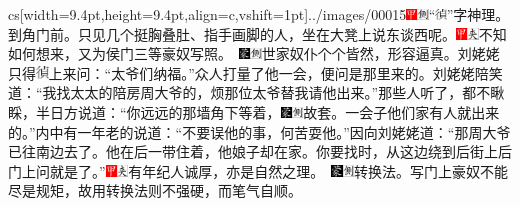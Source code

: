 cs[width=9.4pt,height=9.4pt,align=c,vshift=1pt]{../images/00015}{\includegraphics[width=3mm]{../Images/00002}\includegraphics[width=3mm]{../Images/00011}\footnotesize \kaishu “\includegraphics[width=3mm]{../images/00016}”字神理。}到角门前。只见几个挺胸叠肚、指手画脚的人，坐在大凳上说东谈西呢。{{\includegraphics[width=3mm]{../Images/00002}\includegraphics[width=3mm]{../Images/00012}\footnotesize \kaishu 不知如何想来，又为侯门三等豪奴写照。　}\includegraphics[width=3mm]{../Images/00006}\includegraphics[width=3mm]{../Images/00011}\footnotesize \kaishu 世家奴仆个个皆然，形容逼真。}刘姥姥只得\includegraphics[width=9.4pt,height=9.4pt,align=c,vshift=1pt]{../images/00015}上来问：“太爷们纳福。”众人打量了他一会，便问是那里来的。刘姥姥陪笑道：“我找太太的陪房周大爷的，烦那位太爷替我请他出来。”那些人听了，都不瞅睬，半日方说道：“你远远的那墙角下等着，{\includegraphics[width=3mm]{../Images/00006}\includegraphics[width=3mm]{../Images/00011}\footnotesize \kaishu 故套。}一会子他们家有人就出来的。”内中有一年老的说道：“不要误他的事，何苦耍他。”因向刘姥姥道：“那周大爷已往南边去了。他在后一带住着，他娘子却在家。你要找时，从这边绕到后街上后门上问就是了。”{{\includegraphics[width=3mm]{../Images/00002}\includegraphics[width=3mm]{../Images/00012}\footnotesize \kaishu 有年纪人诚厚，亦是自然之理。　}\includegraphics[width=3mm]{../Images/00006}\includegraphics[width=3mm]{../Images/00011}\footnotesize \kaishu 转换法。写门上豪奴不能尽是规矩，故用转换法则不强硬，而笔气自顺。}

